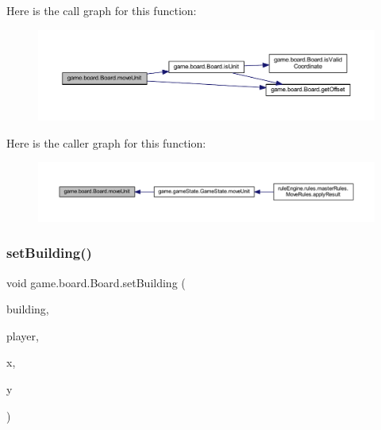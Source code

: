 Here is the call graph for this function\+:
\nopagebreak
\begin{figure}[H]
\begin{center}
\leavevmode
\includegraphics[width=350pt]{classgame_1_1board_1_1_board_a86ad52885974bcca106abcbcf7e3c965_cgraph}
\end{center}
\end{figure}
Here is the caller graph for this function\+:
\nopagebreak
\begin{figure}[H]
\begin{center}
\leavevmode
\includegraphics[width=350pt]{classgame_1_1board_1_1_board_a86ad52885974bcca106abcbcf7e3c965_icgraph}
\end{center}
\end{figure}
\mbox{\label{classgame_1_1board_1_1_board_a663601f177534c45ffd3ded9838b54cc}} 
\subsubsection{\texorpdfstring{set\+Building()}{setBuilding()}}
{\footnotesize\ttfamily void game.\+board.\+Board.\+set\+Building (\begin{DoxyParamCaption}\item[{\mbox{\hyperlink{enumrule_engine_1_1entity_1_1_e_building_property}{E\+Building\+Property}}}]{building,  }\item[{\mbox{\hyperlink{enumgame_1_1_e_player}{E\+Player}}}]{player,  }\item[{int}]{x,  }\item[{int}]{y }\end{DoxyParamCaption})\hspace{0.3cm}{\ttfamily [inline]}}


